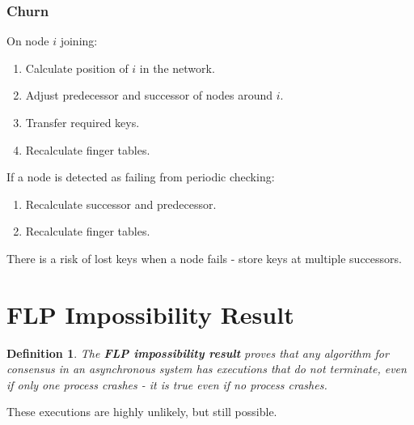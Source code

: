 \documentclass[11pt]{article}
\newtheorem{defn}{Definition}
\begin{document}
\subsubsection{Churn}
On node $i$ joining:
\begin{enumerate}
  \item Calculate position of $i$ in the network.
  \item Adjust predecessor and successor of nodes around $i$.
  \item Transfer required keys.
  \item Recalculate finger tables.
\end{enumerate}

If a node is detected as failing from periodic checking:
\begin{enumerate}
  \item Recalculate successor and predecessor.
  \item Recalculate finger tables.
\end{enumerate}

There is a risk of lost keys when a node fails - store keys at multiple successors.

\section{FLP Impossibility Result}
\begin{defn}
  The \textbf{FLP impossibility result} proves that any algorithm for consensus in an asynchronous system has executions that do not terminate, even if only one process crashes - it is true even if no process crashes.
\end{defn}
These executions are highly unlikely, but still possible.
\end{document}
